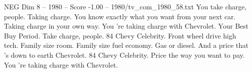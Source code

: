 \begin{textsample}{NEG Dim 8 – 1980 – Score -1.00 – 1980/tv\_com\_1980\_58.txt}  \label{ex:f8_neg_058}
You take charge, people.
Taking charge.
You know exactly what you want from your next car.
Taking charge in your own way.
You 're taking charge with Chevrolet.
Your Best Buy Period.
Take charge, people. 84 Chevy Celebrity.
Front wheel drive high tech.
Family size room.
Family size fuel economy.
Gas or diesel.
And a price that 's down to earth Chevrolet. 84 Chevy Celebrity.
Price the way you want to pay.
You 're taking charge with Chevrolet.

\end{textsample}

